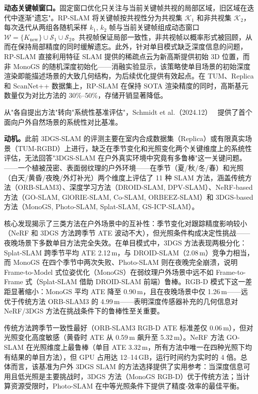 \textbf{动态关键帧窗口。}固定窗口优化只关注与当前关键帧共视的局部区域，旧区域在迭代中逐渐"遗忘"。RP-SLAM 将关键帧按共视性分为共视集 $\mathcal{K}_1$ 和非共视集 $\mathcal{K}_2$，每次迭代从两组各随机采样 $k_1$, $k_2$ 帧与当前关键帧组成动态窗口 $\mathcal{W} = \{K_{\mathrm{new}}\} \cup \mathcal{S}_1 \cup \mathcal{S}_2$。共视帧保证局部一致性，非共视帧以概率形式被回顾，从而在保持局部精度的同时缓解遗忘。此外，针对单目模式缺乏深度信息的问题，RP-SLAM 直接利用特征 SLAM 提供的稀疏点云为新高斯提供初始 3D 位置，而非 MonoGS 的随机深度初始化——消融实验显示，该策略使单目场景的初始深度渲染即能描述场景的大致几何结构，为后续优化提供有效起点。在 TUM、Replica 和 ScanNet++ 数据集上，RP-SLAM 在保持 SOTA 渲染精度的同时，高斯基元数量仅为对比方法的 30\%--50\%，存储开销显著降低。

从"各自提出方法"转向"系统性基准评估"，Schmidt et al.（2024.12）~\cite{2412_03263} 提供了首个面向户外自然场景的系统性对比基准。

\textbf{动机。}此前 3DGS-SLAM 的评测主要在室内合成数据集（Replica）或有限真实场景（TUM-RGBD）上进行，缺乏在季节变化和光照变化两个关键维度上的系统性评估，无法回答"3DGS-SLAM 在户外真实环境中究竟有多鲁棒"这一关键问题。——一个植被茂密、表面弱纹理的户外环境——在季节（夏/秋/冬/春）和光照（白天/黄昏/夜晚/外灯补光）两个维度上评估了 11 种 SLAM 方法，涵盖传统方法（ORB-SLAM3）、深度学习方法（DROID-SLAM, DPV-SLAM）、NeRF-based 方法（GO-SLAM, GlORIE-SLAM, Co-SLAM, ORBEEZ-SLAM）和 3DGS-based 方法（MonoGS, Photo-SLAM, Splat-SLAM, GS-ICP-SLAM）。

核心发现揭示了三类方法在户外场景中的互补性：季节变化对跟踪精度影响较小（NeRF 和 3DGS 方法跨季节 ATE 波动不大），但光照条件构成决定性挑战——夜晚场景下多数单目方法完全失效。在单目模式中，3DGS 方法表现两极分化：Splat-SLAM 跨季节平均 ATE 2.12\,m，与 DROID-SLAM（2.08\,m）竞争力相当，而 MonoGS 在四个季节中两次失败、Photo-SLAM 则在夜晚完全崩溃，说明 Frame-to-Model 式位姿优化（MonoGS）在弱纹理户外场景中远不如 Frame-to-Frame 式（Splat-SLAM 借助 DROID-SLAM 前端）鲁棒。RGB-D 模式下这一差距显著缩小：MonoGS 平均 ATE 降至 0.90\,m，且在夜晚场景中仅 1.26\,m——远优于传统方法 ORB-SLAM3 的 4.99\,m——表明深度传感器补充的几何信息对 NeRF/3DGS 方法在挑战条件下的鲁棒性至关重要。

传统方法跨季节一致性最好（ORB-SLAM3 RGB-D ATE 标准差仅 0.06\,m），但对光照变化高度敏感（黄昏时 ATE 从 0.59\,m 飙升至 5.32\,m）。NeRF 方法 GO-SLAM 在光照维度上最鲁棒（单目 ATE 3.32\,m，所有方法中唯一在四种光照下均有结果的单目方法），但 GPU 占用达 12--14\,GB，运行时间约为实时的 4 倍。总体而言，该基准为户外 3DGS SLAM 的方法选择提供了实用参考：当深度信息可用且低光照是主要挑战时，3DGS 方法（MonoGS RGB-D）优于传统方法；当计算资源受限时，Photo-SLAM 在中等光照条件下提供了精度-效率的最佳平衡。


